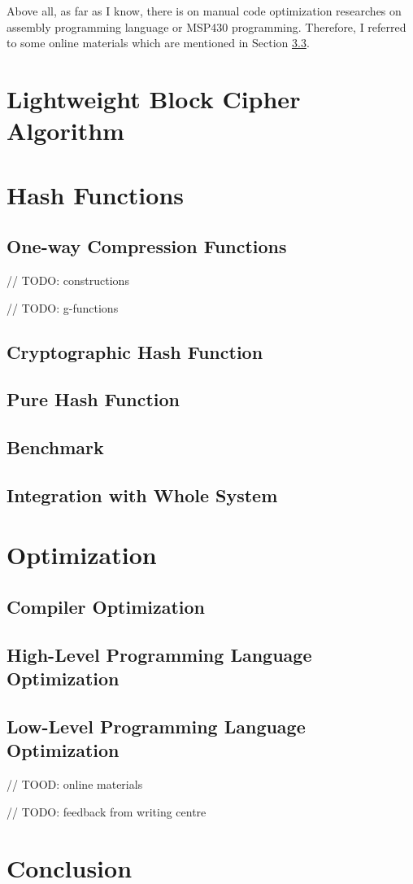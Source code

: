 \documentclass[sigconf, review=false]{acmart}
\begin{document}
Above all, as far as I know, there is on manual code optimization researches
on assembly programming language or MSP430 programming.
Therefore, I referred to some online materials which are mentioned in Section \ref{sec-low}.


\section{Lightweight Block Cipher Algorithm} \label{sec-block}


\section{Hash Functions}
\subsection{One-way Compression Functions} \label{sec-one}
// TODO: constructions

// TODO: g-functions

\subsection{Cryptographic Hash Function}

\subsection{Pure Hash Function}

\subsection{Benchmark}

\subsection{Integration with Whole System} \label{sec-int}



\section{Optimization}

\subsection{Compiler Optimization}

\subsection{High-Level Programming Language Optimization}

\subsection{Low-Level Programming Language Optimization} \label{sec-low}
// TOOD: online materials




// TODO: feedback from writing centre

\section{Conclusion}





\end{document}
